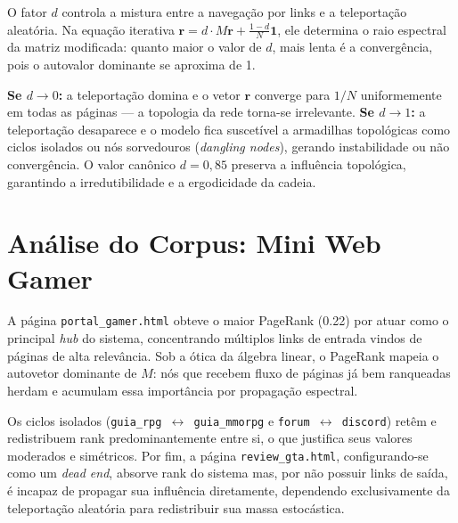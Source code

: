 \documentclass[11pt,a4paper]{article}
\begin{document}
O fator $d$ controla a mistura entre a navegação por links e a teleportação aleatória. Na equação iterativa $\mathbf{r} = d \cdot M\mathbf{r} + \frac{1-d}{N}\mathbf{1}$, ele determina o raio espectral da matriz modificada: quanto maior o valor de $d$, mais lenta é a convergência, pois o autovalor dominante se aproxima de 1.

\textbf{Se $d \to 0$:} a teleportação domina e o vetor $\mathbf{r}$ converge para $1/N$ uniformemente em todas as páginas — a topologia da rede torna-se irrelevante. \textbf{Se $d \to 1$:} a teleportação desaparece e o modelo fica suscetível a armadilhas topológicas como ciclos isolados ou nós sorvedouros (\textit{dangling nodes}), gerando instabilidade ou não convergência. O valor canônico $d = 0{,}85$ preserva a influência topológica, garantindo a irredutibilidade e a ergodicidade da cadeia.

\section{Análise do Corpus: Mini Web Gamer}

A página \texttt{portal\_gamer.html} obteve o maior PageRank (0.22) por atuar como o principal \textit{hub} do sistema, concentrando múltiplos links de entrada vindos de páginas de alta relevância. Sob a ótica da álgebra linear, o PageRank mapeia o autovetor dominante de $M$: nós que recebem fluxo de páginas já bem ranqueadas herdam e acumulam essa importância por propagação espectral.

Os ciclos isolados (\texttt{guia\_rpg $\leftrightarrow$ guia\_mmorpg} e \texttt{forum $\leftrightarrow$ discord}) retêm e redistribuem rank predominantemente entre si, o que justifica seus valores moderados e simétricos. Por fim, a página \texttt{review\_gta.html}, configurando-se como um \textit{dead end}, absorve rank do sistema mas, por não possuir links de saída, é incapaz de propagar sua influência diretamente, dependendo exclusivamente da teleportação aleatória para redistribuir sua massa estocástica.
\end{document}
